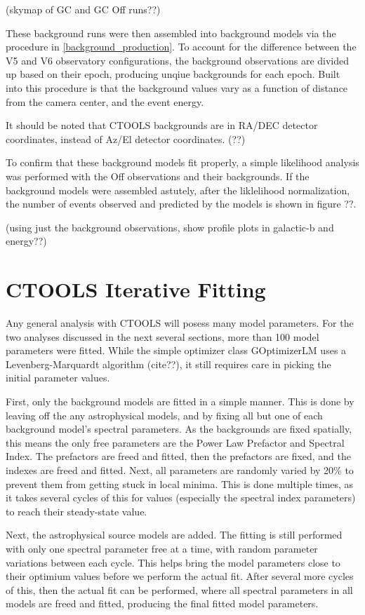(skymap of GC and GC Off runs??)

These background runs were then assembled into background models via the procedure in \ref{background_production}.
To account for the difference between the V5 and V6 observatory configurations, the background observations are divided up based on their epoch, producing unqiue backgrounds for each epoch.
Built into this procedure is that the background values vary as a function of distance from the camera center, and the event energy.

It should be noted that CTOOLS backgrounds are in RA/DEC detector coordinates, instead of Az/El detector coordinates. (??)

To confirm that these background models fit properly, a simple likelihood analysis was performed with the Off observations and their backgrounds.
If the background models were assembled astutely, after the liklelihood normalization, the number of events observed and predicted by the models is shown in figure ??.

(using just the background observations, show profile plots in galactic-b and energy??)

\section{CTOOLS Iterative Fitting}
Any general analysis with CTOOLS will posess many model parameters.
For the two analyses discussed in the next several sections, more than 100 model parameters were fitted.
While the simple optimizer class GOptimizerLM uses a Levenberg-Marquardt algorithm (cite??), it still requires care in picking the initial parameter values.

First, only the background models are fitted in a simple manner.
This is done by leaving off the any astrophysical models, and by fixing all but one of each background model's spectral parameters.
As the backgrounds are fixed spatially, this means the only free parameters are the Power Law Prefactor and Spectral Index.
The prefactors are freed and fitted, then the prefactors are fixed, and the indexes are freed and fitted.
Next, all parameters are randomly varied by 20\% to prevent them from getting stuck in local minima.
This is done multiple times, as it takes several cycles of this for values (especially the spectral index parameters) to reach their steady-state value.

Next, the astrophysical source models are added.
The fitting is still performed with only one spectral parameter free at a time, with random parameter variations between each cycle.
This helps bring the model parameters close to their optimium values before we perform the actual fit.
After several more cycles of this, then the actual fit can be performed, where all spectral parameters in all models are freed and fitted, producing the final fitted model parameters.


